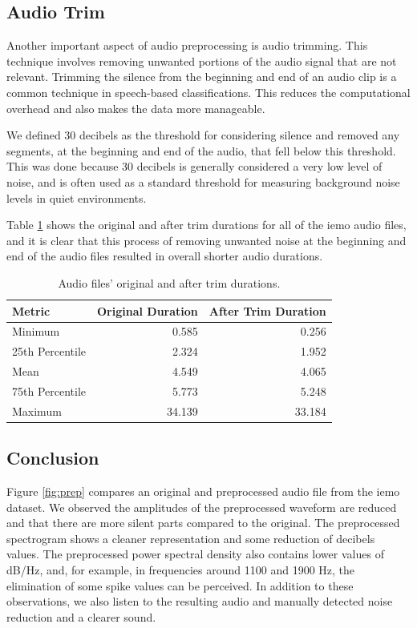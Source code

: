 \subsection{Audio Trim}

Another important aspect of audio preprocessing is audio trimming. This technique involves removing unwanted portions of the audio signal that are not relevant. Trimming the silence from the beginning and end of an audio clip is a common technique in speech-based classifications. This reduces the computational overhead and also makes the data more manageable.

We defined 30 decibels as the threshold for considering silence and removed any segments, at the beginning and end of the audio, that fell below this threshold. This was done because 30 decibels is generally considered a very low level of noise, and is often used as a standard threshold for measuring background noise levels in quiet environments.

Table \ref{trim_durations} shows the original and after trim durations for all of the \ac{iemo} audio files, and it is clear that this process of removing unwanted noise at the beginning and end of the audio files resulted in overall shorter audio durations.

\begin{table}[H]
	\centering
	\caption{Audio files' original and after trim durations.}
	\label{trim_durations}
	\begin{tabular}{lrr}
		\toprule
		Metric & Original Duration & After Trim Duration \\
		\midrule
		Minimum  		&  0.585 	&  0.256 \\
		25th Percentile &  2.324	&  1.952 \\
		Mean 			&  4.549  	&  4.065 \\
		75th Percentile	&  5.773	&  5.248 \\
		Maximum 		& 34.139   	& 33.184 \\
		\bottomrule
	\end{tabular}
\end{table}



\subsection{Conclusion}

Figure \ref{fig:prep} compares an original and preprocessed audio file from the \ac{iemo} dataset. We observed the amplitudes of the preprocessed waveform are reduced and that there are more silent parts compared to the original. The preprocessed spectrogram shows a cleaner representation and some reduction of decibels values. The preprocessed power spectral density also contains lower values of dB/Hz, and, for example, in frequencies around 1100 and 1900 Hz, the elimination of some spike values can be perceived. In addition to these observations, we also listen to the resulting audio and manually detected noise reduction and a clearer sound.

